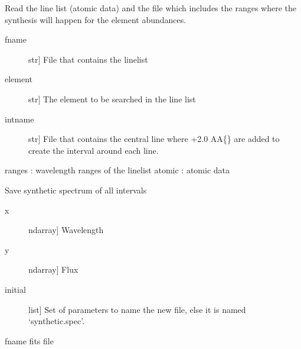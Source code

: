 \documentclass[letterpaper,10pt,english]{sphinxmanual}
\begin{document}

\begin{fulllineitems}
\label{\detokenize{index:FASMA.synthetic.read_linelist_elem}}
Read the line list (atomic data) and the file which includes the ranges
where the synthesis will happen for the element abundances.
\begin{description}
\item[{fname}] \leavevmode{[}str{]}
File that contains the linelist

\item[{element}] \leavevmode{[}str{]}
The element to be searched in the line list

\item[{intname}] \leavevmode{[}str{]}
File that contains the central line where \sphinxhyphen{}+2.0 AA\{\} are added to create
the interval around each line.

\end{description}

ranges : wavelength ranges of the linelist
atomic : atomic data

\end{fulllineitems}


\begin{fulllineitems}
\label{\detokenize{index:FASMA.synthetic.save_synth_spec}}
Save synthetic spectrum of all intervals
\begin{description}
\item[{x}] \leavevmode{[}ndarray{]}
Wavelength

\item[{y}] \leavevmode{[}ndarray{]}
Flux

\item[{initial}] \leavevmode{[}list{]}
Set of parameters to name the new file, else it is named ‘synthetic.spec’.

\end{description}

fname fits file

\end{fulllineitems}
\end{document}
